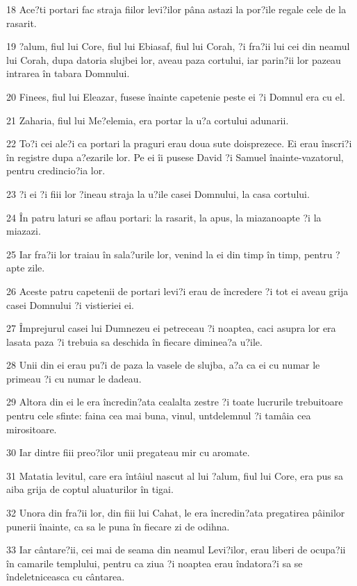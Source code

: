 \par 18 Ace?ti portari fac straja fiilor levi?ilor pâna astazi la por?ile regale cele de la rasarit.
\par 19 ?alum, fiul lui Core, fiul lui Ebiasaf, fiul lui Corah, ?i fra?ii lui cei din neamul lui Corah, dupa datoria slujbei lor, aveau paza cortului, iar parin?ii lor pazeau intrarea în tabara Domnului.
\par 20 Finees, fiul lui Eleazar, fusese înainte capetenie peste ei ?i Domnul era cu el.
\par 21 Zaharia, fiul lui Me?elemia, era portar la u?a cortului adunarii.
\par 22 To?i cei ale?i ca portari la praguri erau doua sute doisprezece. Ei erau înscri?i în registre dupa a?ezarile lor. Pe ei îi pusese David ?i Samuel înainte-vazatorul, pentru credincio?ia lor.
\par 23 ?i ei ?i fiii lor ?ineau straja la u?ile casei Domnului, la casa cortului.
\par 24 În patru laturi se aflau portari: la rasarit, la apus, la miazanoapte ?i la miazazi.
\par 25 Iar fra?ii lor traiau în sala?urile lor, venind la ei din timp în timp, pentru ?apte zile.
\par 26 Aceste patru capetenii de portari levi?i erau de încredere ?i tot ei aveau grija casei Domnului ?i vistieriei ei.
\par 27 Împrejurul casei lui Dumnezeu ei petreceau ?i noaptea, caci asupra lor era lasata paza ?i trebuia sa deschida în fiecare diminea?a u?ile.
\par 28 Unii din ei erau pu?i de paza la vasele de slujba, a?a ca ei cu numar le primeau ?i cu numar le dadeau.
\par 29 Altora din ei le era încredin?ata cealalta zestre ?i toate lucrurile trebuitoare pentru cele sfinte: faina cea mai buna, vinul, untdelemnul ?i tamâia cea mirositoare.
\par 30 Iar dintre fiii preo?ilor unii pregateau mir cu aromate.
\par 31 Matatia levitul, care era întâiul nascut al lui ?alum, fiul lui Core, era pus sa aiba grija de coptul aluaturilor în tigai.
\par 32 Unora din fra?ii lor, din fiii lui Cahat, le era încredin?ata pregatirea pâinilor punerii înainte, ca sa le puna în fiecare zi de odihna.
\par 33 Iar cântare?ii, cei mai de seama din neamul Levi?ilor, erau liberi de ocupa?ii în camarile templului, pentru ca ziua ?i noaptea erau îndatora?i sa se îndeletniceasca cu cântarea.
